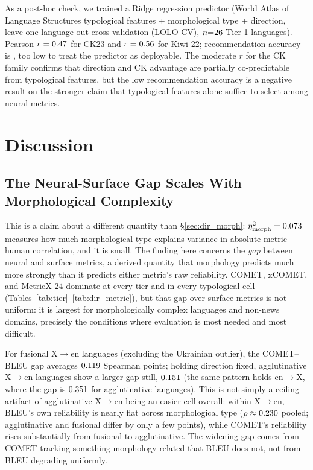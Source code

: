 \documentclass[11pt]{article}
\begin{document}
\begin{table}[t]
\label{tab:lookup}
\end{table}

As a post-hoc check, we trained a Ridge regression predictor (World Atlas of Language Structures \citep[WALS;][]{wals} typological features + morphological type + direction, leave-one-language-out cross-validation (LOLO-CV), $n{=}26$ Tier-1 languages). Pearson $r=0.47$ for CK23 and $r=0.56$ for Kiwi-22; recommendation accuracy is \RidgeRecAcc, too low to treat the predictor as deployable. The moderate $r$ for the CK family confirms that direction and CK advantage are partially co-predictable from typological features, but the low recommendation accuracy is a negative result on the stronger claim that typological features alone suffice to select among neural metrics.

\section{Discussion}
\label{sec:discussion}

\subsection{The Neural-Surface Gap Scales With Morphological Complexity}

This is a claim about a different quantity than \S\ref{sec:dir_morph}: $\eta^2_{\text{morph}}=0.073$ measures how much morphological type explains variance in absolute metric--human correlation, and it is small. The finding here concerns the \emph{gap} between neural and surface metrics, a derived quantity that morphology predicts much more strongly than it predicts either metric's raw reliability. COMET, xCOMET, and MetricX-24 dominate at every tier and in every typological cell (Tables~\ref{tab:tier}--\ref{tab:dir_metric}), but that gap over surface metrics is not uniform: it is largest for morphologically complex languages and non-news domains, precisely the conditions where evaluation is most needed and most difficult.

For fusional X$\to$en languages (excluding the Ukrainian outlier), the COMET--BLEU gap averages $0.119$ Spearman points; holding direction fixed, agglutinative X$\to$en languages show a larger gap still, $0.151$ (the same pattern holds en$\to$X, where the gap is $0.351$ for agglutinative languages). This is not simply a ceiling artifact of agglutinative X$\to$en being an easier cell overall: within X$\to$en, BLEU's own reliability is nearly flat across morphological type ($\rho\approx0.230$ pooled; agglutinative and fusional differ by only a few points), while COMET's reliability rises substantially from fusional to agglutinative. The widening gap comes from COMET tracking something morphology-related that BLEU does not, not from BLEU degrading uniformly.
\end{document}
